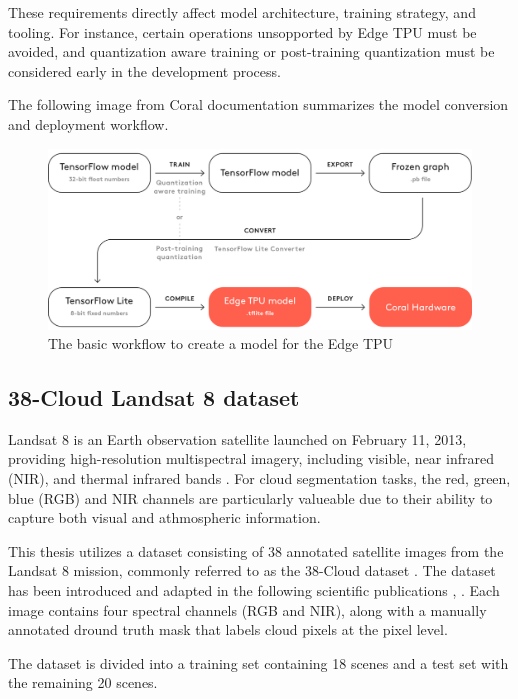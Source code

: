 {These requirements directly affect model architecture, training strategy, and tooling. For instance, certain operations unsopported by Edge TPU must be avoided, and quantization aware training or post-training quantization must be considered early in the development process.

The following image from Coral documentation summarizes the model conversion and deployment workflow.

\begin{figure}[H]
  \centering
  \includegraphics[width=\textwidth]{files/Edge_TPU_quantization.png}
  \caption{The basic workflow to create a model for the Edge TPU}
  \label{fig:quantization-chart}
\end{figure}

\subsection{38-Cloud Landsat 8 dataset}

Landsat 8 is an Earth observation satellite launched on February 11, 2013, providing high-resolution multispectral imagery, including visible, near infrared (NIR), and thermal infrared bands \cite{landsat8}. For cloud segmentation tasks, the red, green, blue (RGB) and NIR channels are particularly valueable due to their ability to capture both visual and athmospheric information.

This thesis utilizes a dataset consisting of 38 annotated satellite images from the Landsat 8 mission, commonly referred to as the 38-Cloud dataset \cite{38cloud}. The dataset has been introduced and adapted in the following scientific publications \cite{CloudNet2019}, \cite{CloudDet2018}. Each image contains four spectral channels (RGB and NIR), along with a manually annotated dround truth mask that labels cloud pixels at the pixel level.

The dataset is divided into a training set containing 18 scenes and a test set with the remaining 20 scenes.

}